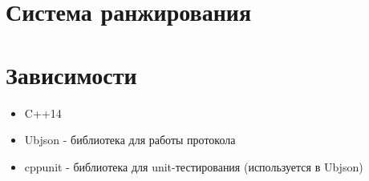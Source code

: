 \documentclass[12pt,a4paper]{scrartcl}
\begin{document}
\section{Система ранжирования}



\section{Зависимости}

\begin{itemize}
    \item C++14
    \item Ubjson  - библиотека для работы протокола
    \item cppunit - библиотека для unit-тестирования (используется в Ubjson)
\end{itemize}
\end{document}
